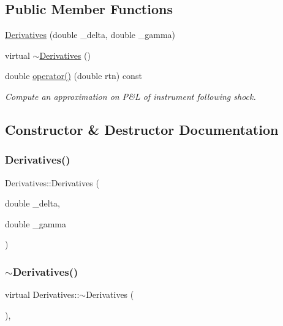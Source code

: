\subsection*{Public Member Functions}
\begin{DoxyCompactItemize}
\item 
\hyperlink{classDerivatives_ab78961446af3fcbfd6cdb0f89ef0eecf}{Derivatives} (double \+\_\+delta, double \+\_\+gamma)
\item 
virtual \hyperlink{classDerivatives_a5766623ccaf59ea949410e456a464b73}{$\sim$\+Derivatives} ()
\item 
double \hyperlink{classDerivatives_a765ecae139ee81fb5143a20462211623}{operator()} (double rtn) const
\begin{DoxyCompactList}\small\item\em Compute an approximation on P\&L of instrument following shock. \end{DoxyCompactList}\end{DoxyCompactItemize}


\subsection{Constructor \& Destructor Documentation}
\hypertarget{classDerivatives_ab78961446af3fcbfd6cdb0f89ef0eecf}{}\label{classDerivatives_ab78961446af3fcbfd6cdb0f89ef0eecf} 
\subsubsection{\texorpdfstring{Derivatives()}{Derivatives()}}
{\footnotesize\ttfamily Derivatives\+::\+Derivatives (\begin{DoxyParamCaption}\item[{double}]{\+\_\+delta,  }\item[{double}]{\+\_\+gamma }\end{DoxyParamCaption})}

\hypertarget{classDerivatives_a5766623ccaf59ea949410e456a464b73}{}\label{classDerivatives_a5766623ccaf59ea949410e456a464b73} 
\subsubsection{\texorpdfstring{$\sim$\+Derivatives()}{~Derivatives()}}
{\footnotesize\ttfamily virtual Derivatives\+::$\sim$\+Derivatives (\begin{DoxyParamCaption}{ }\end{DoxyParamCaption})\hspace{0.3cm}{\ttfamily [inline]}, {\ttfamily [virtual]}}




